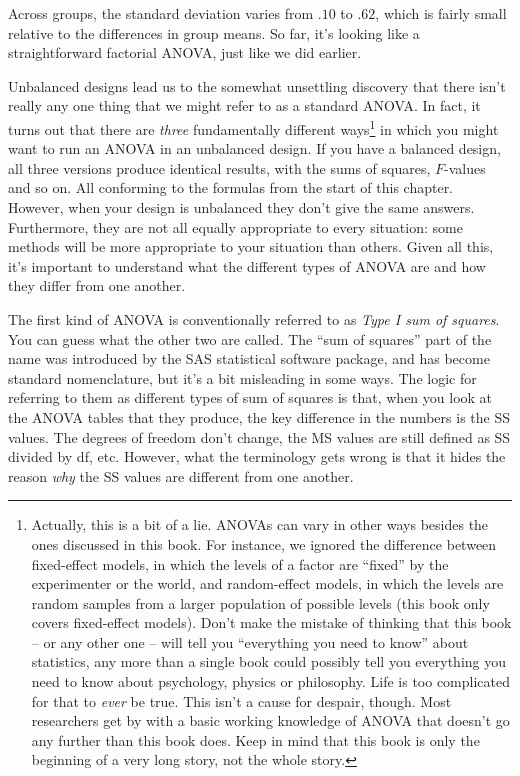 \documentclass[
]{book}
\theoremstyle{definition}
\theoremstyle{definition}
\theoremstyle{definition}
\theoremstyle{definition}
\theoremstyle{remark}
\begin{document}
Across groups, the standard deviation varies from \(.10\) to \(.62\), which is fairly small relative to the differences in group means. So far, it's looking like a straightforward factorial ANOVA, just like we did earlier.

Unbalanced designs lead us to the somewhat unsettling discovery that there isn't really any one thing that we might refer to as a standard ANOVA. In fact, it turns out that there are \emph{three} fundamentally different ways\footnote{Actually, this is a bit of a lie. ANOVAs can vary in other ways besides the ones discussed in this book. For instance, we ignored the difference between fixed-effect models, in which the levels of a factor are ``fixed'' by the experimenter or the world, and random-effect models, in which the levels are random samples from a larger population of possible levels (this book only covers fixed-effect models). Don't make the mistake of thinking that this book -- or any other one -- will tell you ``everything you need to know'' about statistics, any more than a single book could possibly tell you everything you need to know about psychology, physics or philosophy. Life is too complicated for that to \emph{ever} be true. This isn't a cause for despair, though. Most researchers get by with a basic working knowledge of ANOVA that doesn't go any further than this book does. Keep in mind that this book is only the beginning of a very long story, not the whole story.} in which you might want to run an ANOVA in an unbalanced design. If you have a balanced design, all three versions produce identical results, with the sums of squares, \(F\)-values and so on. All conforming to the formulas from the start of this chapter. However, when your design is unbalanced they don't give the same answers. Furthermore, they are not all equally appropriate to every situation: some methods will be more appropriate to your situation than others. Given all this, it's important to understand what the different types of ANOVA are and how they differ from one another.

The first kind of ANOVA is conventionally referred to as \emph{Type I sum of squares}. You can guess what the other two are called. The ``sum of squares'' part of the name was introduced by the SAS statistical software package, and has become standard nomenclature, but it's a bit misleading in some ways. The logic for referring to them as different types of sum of squares is that, when you look at the ANOVA tables that they produce, the key difference in the numbers is the SS values. The degrees of freedom don't change, the MS values are still defined as SS divided by df, etc. However, what the terminology gets wrong is that it hides the reason \emph{why} the SS values are different from one another.
\end{document}
